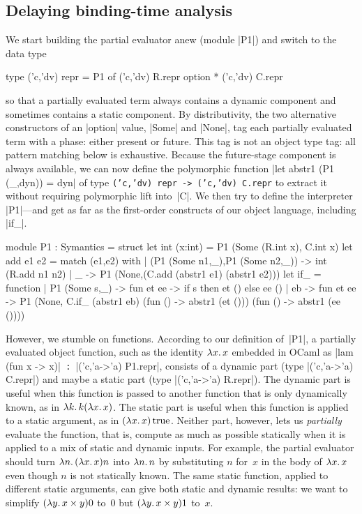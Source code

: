 \subsection{Delaying binding-time analysis}
\label{S:PE-problem}

We start building the partial evaluator anew (module |P1|) and
switch to the data type
\begin{code}
type ('c,'dv) repr = P1 of ('c,'dv) R.repr option * ('c,'dv) C.repr
\end{code}
so that a partially evaluated term always contains a dynamic
component and sometimes contains a static component.  By 
distributivity, the two
alternative constructors of an |option| value, |Some| and |None|,
tag each partially evaluated term with a phase: either present or
future.  This tag is not an object type tag: all pattern matching below
is exhaustive. Because the future-stage component is always available, we
can now define the polymorphic function
|let abstr1 (P1 (_,dyn)) = dyn| of type
\texttt{('c,'dv) repr -> ('c,'dv) C.repr}
to extract it without requiring polymorphic lift into~|C|.  We then try
to define the interpreter |P1|---and get as far as the first-order
constructs of our object language, including |if_|.
\begin{code}
module P1 : Symantics = struct
  let int (x:int) = P1 (Some (R.int x), C.int x)
  let add e1 e2 = match (e1,e2) with
    | (P1 (Some n1,_),P1 (Some n2,_)) -> int (R.add n1 n2)
    | _ -> P1 (None,(C.add (abstr1 e1) (abstr1 e2)))
  let if_ = function
    | P1 (Some s,_) -> fun et ee -> if s then et () else ee ()
    | eb -> fun et ee -> P1 (None, C.if_ (abstr1 eb) 
                                   (fun () -> abstr1 (et ()))
                                   (fun () -> abstr1 (ee ())))
\end{code}
However, we stumble on functions.  According to our
definition of~|P1|, a partially evaluated object function, such as the
identity $\mathopen{\lambda\mathord{x}.\,}x$ embedded in OCaml as |lam (fun x -> x)|\texttt{ :
}|('c,'a->'a) P1.repr|, consists of a dynamic part 
(type |('c,'a->'a) C.repr|) and
maybe a static part (type |('c,'a->'a) R.repr|).  The dynamic part is useful
when this function is passed to another function that is only
dynamically known, as in $\mathopen{\lambda\mathord{k}.\,}k(\mathopen{\lambda\mathord{x}.\,}x)$.  The static part is
useful when this function is applied to a static argument, as in
$(\mathopen{\lambda\mathord{x}.\,}x)\mathinner{\mathrm{true}}$.  Neither part, however, lets us \emph{partially}
evaluate the function, that is, compute as much as possible statically
when it is applied to a mix of static and dynamic inputs.  For example,
the partial evaluator should turn $\mathopen{\lambda\mathord{n}.\,}(\mathopen{\lambda\mathord{x}.\,}x)n$ into $\mathopen{\lambda\mathord{n}.\,}n$
by substituting $n$ for~$x$ in the body of $\mathopen{\lambda\mathord{x}.\,}x$ even though $n$ is
not statically known.  The same static function, applied to
different static arguments, can give both static and dynamic results: we
want to simplify $(\mathopen{\lambda\mathord{y}.\,}x\times y)0$ to~$0$ but $(\mathopen{\lambda\mathord{y}.\,}x\times y)1$
to~$x$.

